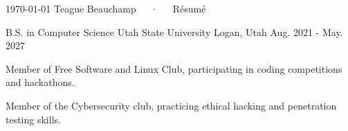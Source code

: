 \documentclass[11pt, a4paper]{awesome-cv}
\begin{document}
  \makecvheader[C]

  \makecvfooter
    {\today}
    {Teague Beauchamp~~~·~~~Résumé}
    {\thepage}



  \begin{cventries}

    \cventry
      {B.S. in Computer Science}
      {Utah State University}
      {Logan, Utah}
      {Aug. 2021 - May. 2027}
      {
        \begin{cvitems}
          \item {Member of Free Software and Linux Club, participating in coding competitions and hackathons.}
          \item {Member of the Cybersecurity club, practicing ethical hacking and penetration testing skills.}
        \end{cvitems}
      }

  \end{cventries}

\end{document}

